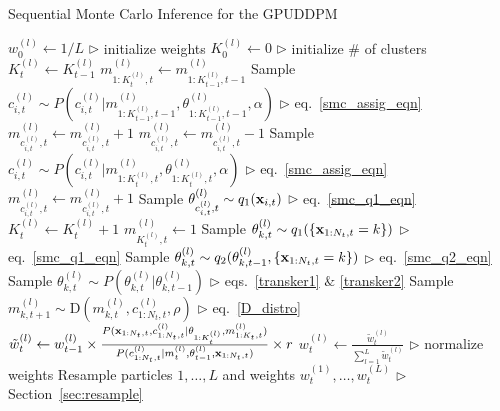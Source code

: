 \documentclass[twocolumn, final]{svjour3}
\begin{document}
\begin{algorithm*}[!]
\caption{Sequential Monte Carlo Inference for the GPUDDPM}
\label{alg:SMC}
\begin{algorithmic}[1]
\STATE $w_{0}^{(l)} \leftarrow 1/L$ \hfill $\triangleright$ initialize weights
\ENDFOR
\STATE $K_{0}^{(l)} \leftarrow 0$ \hfill $\triangleright$ initialize \# of clusters
\STATE $K_{t}^{(l)}  \leftarrow K_{t-1}^{(l)}$
\STATE $m_{1:K_{t}^{(l)}, t}^{(l)} \leftarrow m_{1:K_{t-1}^{(l)}, t-1}^{(l)}$
\STATE Sample $c_{i,t}^{(l)} \sim P \left( c_{i,t}^{(l)} | m_{1:K_{t-1}^{(l)}, t-1}^{(l)}, \theta_{1:K_{t-1}^{(l)}, t-1}^{(l)}, \alpha \right)$  \hfill $\triangleright$ eq.~\eqref{smc_assig_eqn}
\STATE $m_{c_{i,t}^{(l)},t}^{(l)} \leftarrow m_{c_{i,t}^{(l)},t}^{(l)} + 1$
\ELSE
\STATE $m_{c_{i,t}^{(l)},t}^{(l)} \leftarrow m_{c_{i,t}^{(l)},t}^{(l)} - 1$
\STATE Sample $c_{i,t}^{(l)} \sim P \left( c_{i,t}^{(l)} | m_{1:K_{t}^{(l)}, t}^{(l)}, \theta_{1:K_{t}^{(l)}, t}^{(l)}, \alpha \right)$  \hfill $\triangleright$ eq.~\eqref{smc_assig_eqn}
\STATE $m_{c_{i,t}^{(l)},t}^{(l)} \leftarrow m_{c_{i,t}^{(l)},t}^{(l)} + 1$
\ENDIF
{}
\STATE Sample $\theta_{c_{i,t}^{(l)}, t}^{(l)} \sim q_{1}(\bold{x}_{i,t})$ \hfill $\triangleright$ eq.~\eqref{smc_q1_eqn}
\STATE $K_{t}^{(l)} \leftarrow K_{t}^{(l)} + 1$
\STATE $m_{K_{t}^{(l)},t}^{(l)} \leftarrow 1$
\ENDIF
\ENDFOR
{}
\STATE Sample $\theta_{k,t}^{(l)} \sim q_{1}(\{ \bold{x}_{1:N_{t}, t} = k \})$  \hfill $\triangleright$ eq.~\eqref{smc_q1_eqn}
\STATE Sample $\theta_{k,t}^{(l)} \sim q_{2}(\theta_{k,t-1}^{(l)}, \{ \bold{x}_{1:N_{t}, t} = k \})$  \hfill $\triangleright$ eq.~\eqref{smc_q2_eqn}
\STATE Sample $\theta_{k,t}^{(l)} \sim P(\theta_{k,t}^{(l)} | \theta_{k,t-1}^{(l)})$  \hfill $\triangleright$ eqs.~\eqref{transker1} $\&$ \eqref{transker2}
\ENDIF
{}
\STATE Sample $m_{k,t+1}^{(l)} \sim \text{D}(m_{k,t}^{(l)}, c_{1:N_{t}, t}^{(l)}, \rho)$  \hfill $\triangleright$ eq.~\eqref{D_distro}
\ENDIF
\ENDFOR
\ENDFOR
\STATE $\tilde{w}_{t}^{(l)} \leftarrow w_{t-1}^{(l)} \times \frac{ P(\bold{x}_{1:N_{t},t}, c_{1:N_{t}, t}^{(l)} | \theta_{1:K_{t}^{(l)}}, m_{1:K_{t},t}^{(l)})} {P(c_{1:N_{t}, t}^{(l)} | m_{t}^{(l)}, \theta_{t-1}^{(l)}, \bold{x}_{1:N_{t},t} ) } \times r $  %
\ENDFOR
{}
\STATE $w_{t}^{(l)} \leftarrow \frac{\tilde{w}_{t}^{(l)}}{\sum_{l=1}^{L} \tilde{w}_{t}^{(l)} }$   \hfill $\triangleright$ normalize weights
\ENDFOR
\STATE Resample particles $1, \ldots, L$ and weights $w_{t}^{(1)}, \ldots, w_{t}^{(L)}$   \hfill $\triangleright$ Section~\ref{sec:resample}
\ENDFOR
\end{algorithmic}
\end{algorithm*}
\end{document}
